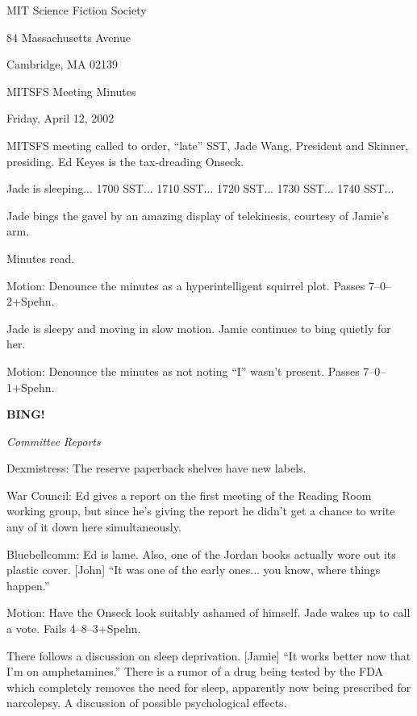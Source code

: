 \documentclass[12pt]{article}
\newcommand{\bing}{{\bf BING!} }
\newcommand{\goto}[1]{\bing \vskip 12pt \centerline{{\em{#1}}}}
\begin{document}
\begin{center}

MIT Science Fiction Society 

84 Massachusetts Avenue

Cambridge, MA 02139

\vspace{12pt}

MITSFS Meeting Minutes 

Friday, April 12, 2002

\end{center}
 
\vspace{18pt}

\setlength{\parskip}{6pt}

\noindent
MITSFS meeting called to order, ``late'' SST, Jade Wang, President and
Skinner, presiding.  Ed Keyes is the tax-dreading Onseck.

Jade is sleeping... 1700 SST... 1710 SST... 1720 SST... 1730 SST...
1740 SST...

Jade bings the gavel by an amazing display of telekinesis, courtesy
of Jamie's arm.

Minutes read.

Motion: Denounce the minutes as a hyperintelligent squirrel plot.
Passes 7--0--2+Spehn.

Jade is sleepy and moving in slow motion.  Jamie continues to bing
quietly for her.

Motion: Denounce the minutes as not noting ``I'' wasn't present.
Passes 7--0--1+Spehn.

\goto{Committee Reports}

Dexmistress: The reserve paperback shelves have new labels.

War Council: Ed gives a report on the first meeting of the Reading
Room working group, but since he's giving the report he didn't get
a chance to write any of it down here simultaneously.

Bluebellcomm: Ed is lame.  Also, one of the Jordan books actually
wore out its plastic cover.  [John] ``It was one of the early ones...
you know, where things happen.''

Motion: Have the Onseck look suitably ashamed of himself.  Jade wakes
up to call a vote.  Fails 4--8--3+Spehn.

There follows a discussion on sleep deprivation.  [Jamie] ``It works
better now that I'm on amphetamines.''  There is a rumor of a drug
being tested by the FDA which completely removes the need for sleep,
apparently now being prescribed for narcolepsy.  A discussion of
possible psychological effects.
\end{document}
